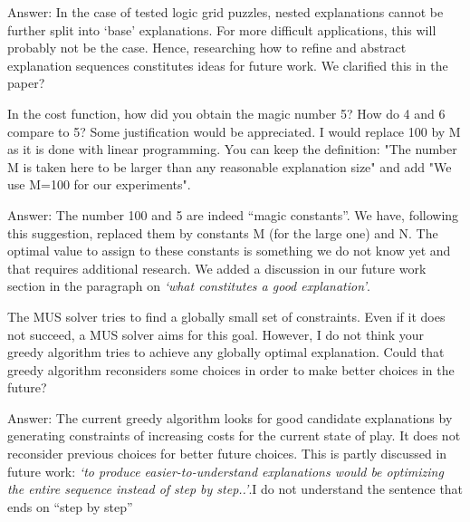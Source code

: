 \documentclass{article}
\newcommand\comment[1]{\marginpar{\tiny #1}}
\renewcommand\comment[1]{#1}
\newcommand{\emilio}[1]{{\comment{Answer: \color{red}#1}}}
\newcommand{\bart}[1]{{\comment{\color{green}#1}}}
\begin{document}
\emilio{In the case of tested logic grid puzzles, nested explanations cannot be further split into `base' explanations. For more difficult applications, this will probably not be the case. Hence, researching how to refine and abstract explanation sequences constitutes ideas for future work.} \bart{We clarified this in the paper?}

\begin{quoteit}
In the cost function, how did you obtain the magic number 5? How do 4 and 6 compare to 5? Some justification would be appreciated. 
I would replace 100 by M as it is done with linear programming. You can keep the definition: "The number M is taken here to be larger than any reasonable explanation size" and add "We use M=100 for our experiments".
\end{quoteit}

\emilio{
	The number 100 and 5 are indeed ``magic constants''. We have, following this suggestion, replaced them by constants M (for the large one) and N. The optimal value to assign to these constants is something we do not know yet and that requires additional research. We added a discussion in our future work section in the paragraph on \emph{`what constitutes a good explanation'}.
}

\begin{quoteit}
The MUS solver tries to find a globally small set of constraints. Even if it does not succeed, a MUS solver aims for this goal. However, I do not think your greedy algorithm tries to achieve any globally optimal explanation.
Could that greedy algorithm reconsiders some choices in order to make better choices in the future?
\end{quoteit}

\emilio{The current greedy algorithm looks for good candidate explanations by generating constraints of increasing costs for the current state of play. It does not reconsider previous choices for better future choices. This is partly discussed in future work: \emph{`to produce easier-to-understand explanations would be optimizing the entire sequence instead of step by step..'}.}\bart{I do not understand the sentence that ends on ``step by step''}
\end{document}
